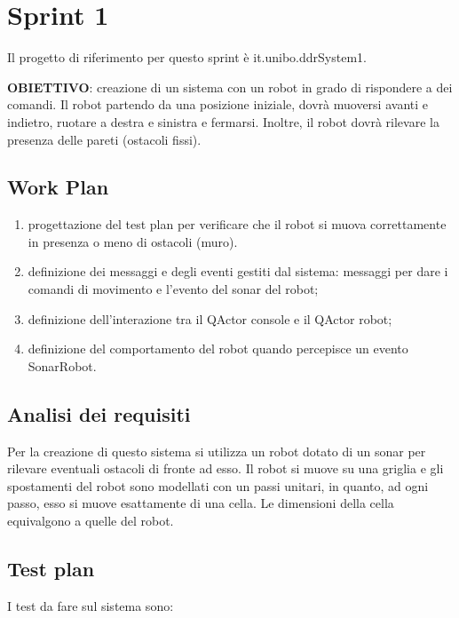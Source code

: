 \newpage
\section{Sprint 1}
Il progetto di riferimento per questo sprint è it.unibo.ddrSystem1.

\textbf {OBIETTIVO}: creazione di un sistema con un robot in grado di rispondere a dei comandi. Il robot partendo da una posizione iniziale, dovrà muoversi avanti e indietro, ruotare a destra e sinistra e fermarsi. Inoltre,  il robot dovrà rilevare la presenza delle pareti (ostacoli fissi).

\subsection{Work Plan}
\begin{enumerate}

    \item progettazione del test plan per verificare che il robot si muova correttamente in presenza o meno di ostacoli (muro). 

    \item definizione dei messaggi e degli eventi gestiti dal sistema: messaggi per dare i comandi di movimento e l'evento del sonar del robot; 
    
    \item definizione dell'interazione tra il QActor console e il QActor robot;
    
    \item definizione del comportamento del robot quando percepisce un evento SonarRobot.
    
\end{enumerate}


\subsection{Analisi dei requisiti}
Per la creazione di questo sistema si utilizza un robot dotato di un sonar per rilevare eventuali ostacoli di fronte ad esso. Il robot si muove su una griglia e gli spostamenti del robot sono modellati con un passi unitari, in quanto, ad ogni passo, esso si muove esattamente di una cella. Le dimensioni della cella equivalgono a quelle del robot. 

\subsection{Test plan}
I test da fare sul sistema sono:\\
\newline

